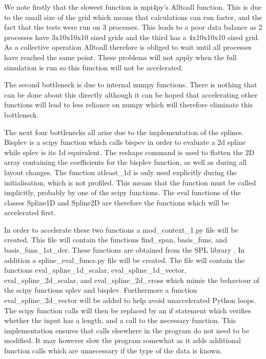 We note firstly that the slowest function is mpi4py’s Alltoall function. This is due to the small size of the grid which means that calculations can run faster, and the fact that the tests were run on 3 processes. This leads to a poor data balance as 2 processes have 3x10x10x10 sized grids and the third has a 4x10x10x10 sized grid. As a collective operation Alltoall therefore is obliged to wait until all processes have reached the same point. These problems will not apply when the full simulation is run so this function will not be accelerated. 

The second bottleneck is due to internal numpy functions. There is nothing that can be done about this directly although it can be hoped that accelerating other functions will lead to less reliance on numpy which will therefore eliminate this bottleneck.

The next four bottlenecks all arise due to the implementation of the splines. Bisplev is a scipy function which calls bispev in order to evaluate a 2d spline while splev is its 1d equivalent. The reshape command is used to flatten the 2D array containing the coefficients for the bisplev function, as well as during all layout changes. The function atleast\_1d  is  only used explicitly during the initialisation, which is not profiled. This means that the function must be called implicitly,  probably by one of the scipy functions. The eval functions of the classes Spline1D and Spline2D are therefore the functions which will be accelerated first.

In order to accelerate these two functions a mod\_context\_1.py file will be created. This file will contain the functions find\_span, basis\_funs, and basis\_funs\_1st\_der. These functions are obtained from the SPL library \cite{Python SPL}.  In addition a spline\_eval\_funcs.py file will be created. The file will contain the functions eval\_spline\_1d\_scalar, eval\_spline\_1d\_vector, eval\_spline\_2d\_scalar, and eval\_spline\_2d\_cross which mimic the behaviour of the scipy functions splev and bisplev. Furthermore a function eval\_spline\_2d\_vector will be added to help avoid unaccelerated Python loops. The scipy function calls will then be replaced by an if statement which verifies whether the input has a length, and a call to the necessary function. This implementation ensures that calls elsewhere in the program do not need to be modified. It may however slow the program somewhat as it adds additional function calls which are unnecessary if the type of the data is known.

